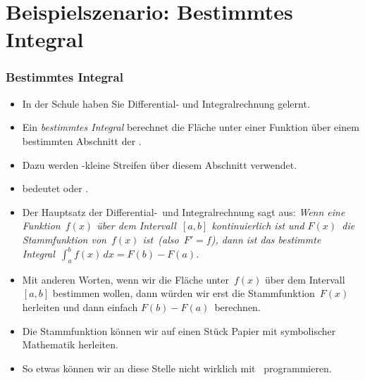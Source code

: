 \documentclass[aspectratio=169,mathserif,notheorems]{beamer}%
\begin{document}
\section{Beispielszenario: Bestimmtes Integral}%
%
\begin{frame}%
\frametitle{Bestimmtes Integral}%
\begin{itemize}%
\item In der Schule haben Sie Differential- und Integralrechnung gelernt.%
%
\item<2-> Ein \emph{bestimmtes Integral} berechnet die Fläche unter einer Funktion über einem bestimmten Abschnitt der .%
%
\item<3-> Dazu werden -kleine Streifen über diesem Abschnitt verwendet.%
%
\item<4->  bedeutet \emph{} oder \emph{}.
%
\item<5-> Der Hauptsatz der Differential-\ und Integralrechnung sagt aus: \emph{Wenn eine Funktion~$f(x)$ über dem Intervall~$[a,b]$ kontinuierlich ist und $F(x)$~die Stammfunktion von~$f(x)$ ist~(also~$F'=f$), dann ist das bestimmte Integral~$\int_a^b f(x)\,dx = F(b)-F(a)$.}%
%
\item<6-> Mit anderen Worten, wenn wir die Fläche unter~$f(x)$ über dem Intervall~$[a,b]$ bestimmen wollen, dann würden wir erst die Stammfunktion~$F(x)$ herleiten und dann einfach $F(b)-F(a)$~berechnen.%
%
\item<7-> Die Stammfunktion können wir auf einen Stück Papier mit symbolischer Mathematik herleiten.%
%
\item<8-> So etwas können wir an diese Stelle nicht wirklich mit \python\ programmieren.%
%
\end{itemize}%
%
\end{frame}%
%
\end{document}
